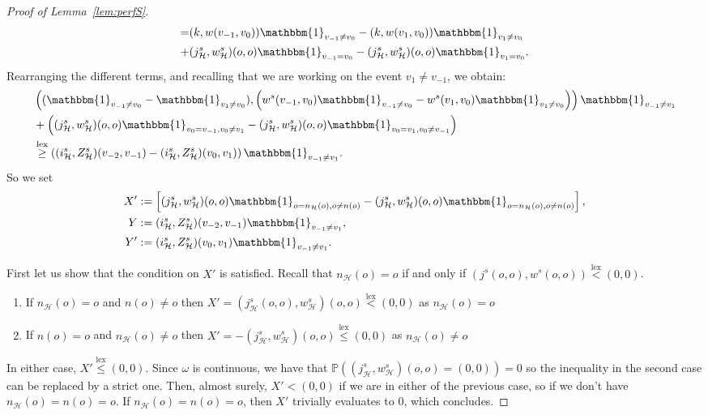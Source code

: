 \documentclass[11pt]{article}
\DeclareMathOperator{\lex}{lex}
\begin{document}
\begin{proof}[Proof of Lemma~\ref{lem:perfS}]
\begin{align*}
    =&(k,w(v_{-1},v_{0}))\mathbbm{1}_{v_{-1}\neq v_{0}}-(k,w(v_1,v_{0}))\mathbbm{1}_{v_1 \neq v_{0}} \\
    +&(j_{\mathcal{H}}^s,w_{\mathcal{H}}^s)(o,o)\mathbbm{1}_{v_{-1}=v_{0}}-(j_{\mathcal{H}}^s,w_{\mathcal{H}}^s)(o,o)\mathbbm{1}_{v_{1}=v_{0}}.
\end{align*}
Rearranging the different terms, and recalling that we are working on the event $v_1 \neq v_{-1}$, we obtain:
\begin{align*}
    &\left((\mathbbm{1}_{v_{-1}\neq v_0}-\mathbbm{1}_{v_1\neq v_0}),\left(w^s(v_{-1},v_0)\mathbbm{1}_{v_{-1}\neq v_0}-w^s(v_{1},v_0)\mathbbm{1}_{v_1 \neq v_0}\right) \right)\mathbbm{1}_{v_{-1}\neq v_1} \\
    &+ \left((j_{\mathcal{H}}^s, w_{\mathcal{H}}^s)(o,o)  \mathbbm{1}_{v_0=v_{-1}, v_0 \neq v_1}-( j_{\mathcal{H}}^s, w_{\mathcal{H}}^s)(o,o)  \mathbbm{1}_{v_0=v_{1}, v_0 \neq v_{-1}} \right) \\
    &\overset{\lex}{\geq} \left( (i^s_{\mathcal{H}},Z^s_{\mathcal{H}})(v_{-2},v_{-1}) -(i^s_{\mathcal{H}},Z^s_{\mathcal{H}})(v_{0},v_{1})\right)\mathbbm{1}_{v_{-1} \neq v_1}.
\end{align*}
So we set
\begin{align*}
    X'&:=\left[ (j_{\mathcal{H}}^s, w_{\mathcal{H}}^s)(o,o)  \mathbbm{1}_{o=n_{\mathcal{H}}(o),o\neq n(o)}- (j_{\mathcal{H}}^s, w_{\mathcal{H}}^s)(o,o)  \mathbbm{1}_{o=n_{\mathcal{H}}(o),o\neq n(o)}\right], \\
    Y&:=(i^s_{\mathcal{H}},Z^s_{\mathcal{H}})(v_{-2},v_{-1})\mathbbm{1}_{v_{-1} \neq v_1} , \\
    Y'&:=(i^s_{\mathcal{H}},Z^s_{\mathcal{H}})(v_{0},v_{1})\mathbbm{1}_{v_{-1} \neq v_1} .
\end{align*}

First let us show that the condition on $X'$ is satisfied.
Recall that $n_{\mathcal{H}}(o)=o$ if and only if $(j^s(o,o),w^s(o,o)) \overset{\lex}{<} (0,0)$.
\begin{enumerate}
\item If $n_{\mathcal{H}}(o)=o$ and $n(o) \neq o$ then $X'=(j_{\mathcal{H}}^s(o,o),w_{\mathcal{H}}^s)(o,o) \overset{\lex}{<} (0,0)$ as $n_{\mathcal{H}}(o)=o$ 
\item If $n(o)=o$ and $n_{\mathcal{H}}(o) \neq o$ then $X'=-(j_{\mathcal{H}}^s,w_{\mathcal{H}}^s)(o,o) \overset{\lex}{\leq }(0,0)$ as $n_{\mathcal{H}}(o) \neq o$
\end{enumerate}
In either case, $X' \overset{\lex}{\leq }(0,0)$. Since $\omega$ is continuous, we have that $\mathbb{P}((j_{\mathcal{H}}^s,w_{\mathcal{H}}^s)(o,o)=(0,0))=0$ so the inequality in the second case can be replaced by a strict one. Then, almost surely, $X'<(0,0)$ if we are in either of the previous case, so if we don't have $n_{\mathcal{H}}(o)=n(o)=o$.
If $n_{\mathcal{H}}(o)=n(o)=o$, then $X'$ trivially evaluates to $0$, which concludes.


\end{proof}
\end{document}

